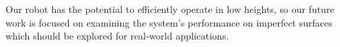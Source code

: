 \documentclass[letterpaper,10pt,conference]{ieeeconf}
\newcommand{\brian}[1]{{\color{brown}#1}}
\begin{document}


Our robot has the potential to efficiently operate in low heights, so our future work is focused on examining the system's performance on imperfect surfaces which should be explored for real-world applications.





\end{document}
